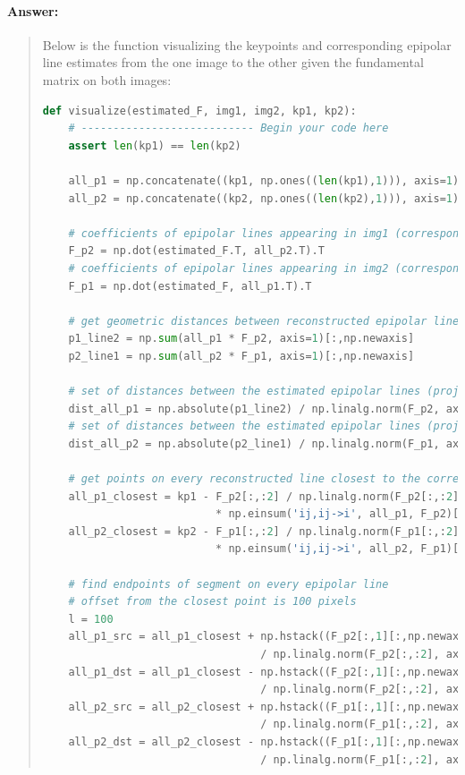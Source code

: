 \documentclass[11pt]{article}
\begin{document}
\paragraph{Answer:} 
\begin{quote}

Below is the function visualizing the keypoints and corresponding epipolar line estimates from the one image to the other given the fundamental matrix on both images:

\begin{lstlisting}[language=Python, basicstyle=\scriptsize]
def visualize(estimated_F, img1, img2, kp1, kp2):
    # --------------------------- Begin your code here
    assert len(kp1) == len(kp2)
    
    all_p1 = np.concatenate((kp1, np.ones((len(kp1),1))), axis=1)
    all_p2 = np.concatenate((kp2, np.ones((len(kp2),1))), axis=1)
    
    # coefficients of epipolar lines appearing in img1 (corresponding to epipoles all_p1)
    F_p2 = np.dot(estimated_F.T, all_p2.T).T
    # coefficients of epipolar lines appearing in img2 (corresponding to epipoles all_p2)
    F_p1 = np.dot(estimated_F, all_p1.T).T    

    # get geometric distances between reconstructed epipolar lines and corresponding epipoles
    p1_line2 = np.sum(all_p1 * F_p2, axis=1)[:,np.newaxis]
    p2_line1 = np.sum(all_p2 * F_p1, axis=1)[:,np.newaxis]

    # set of distances between the estimated epipolar lines (projected from p2) and epipoles (p1)
    dist_all_p1 = np.absolute(p1_line2) / np.linalg.norm(F_p2, axis=1)[:,np.newaxis]
    # set of distances between the estimated epipolar lines (projected from p1) and epipoles (p2)
    dist_all_p2 = np.absolute(p2_line1) / np.linalg.norm(F_p1, axis=1)[:,np.newaxis]

    # get points on every reconstructed line closest to the corresponding epipole
    all_p1_closest = kp1 - F_p2[:,:2] / np.linalg.norm(F_p2[:,:2], axis=1)[:,np.newaxis] \
                           * np.einsum('ij,ij->i', all_p1, F_p2)[:,np.newaxis]
    all_p2_closest = kp2 - F_p1[:,:2] / np.linalg.norm(F_p1[:,:2], axis=1)[:,np.newaxis] \
                           * np.einsum('ij,ij->i', all_p2, F_p1)[:,np.newaxis]

    # find endpoints of segment on every epipolar line
    # offset from the closest point is 100 pixels
    l = 100
    all_p1_src = all_p1_closest + np.hstack((F_p2[:,1][:,np.newaxis], -F_p2[:,0][:,np.newaxis])) \
                                  / np.linalg.norm(F_p2[:,:2], axis=1)[:, np.newaxis] * l
    all_p1_dst = all_p1_closest - np.hstack((F_p2[:,1][:,np.newaxis], -F_p2[:,0][:,np.newaxis])) \
                                  / np.linalg.norm(F_p2[:,:2], axis=1)[:, np.newaxis] * l
    all_p2_src = all_p2_closest + np.hstack((F_p1[:,1][:,np.newaxis], -F_p1[:,0][:,np.newaxis])) \
                                  / np.linalg.norm(F_p1[:,:2], axis=1)[:, np.newaxis] * l
    all_p2_dst = all_p2_closest - np.hstack((F_p1[:,1][:,np.newaxis], -F_p1[:,0][:,np.newaxis])) \
                                  / np.linalg.norm(F_p1[:,:2], axis=1)[:, np.newaxis] * l


\end{lstlisting}
\end{quote}
\end{document}
